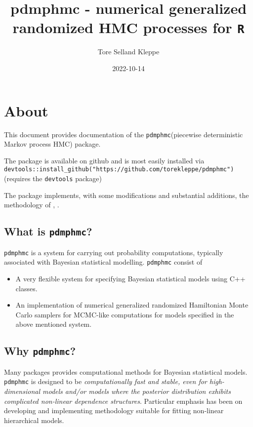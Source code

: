 \documentclass[
]{book}
\title{pdmphmc - numerical generalized randomized HMC processes for \texttt{R}}
\author{Tore Selland Kleppe}
\date{2022-10-14}
\begin{document}
\maketitle

{
\setcounter{tocdepth}{1}
\tableofcontents
}
\hypertarget{about}{%
\chapter{About}\label{about}}

This document provides documentation of the \texttt{pdmphmc}(piecewise deterministic Markov process HMC) package.

The package is available on github and is most easily installed via \texttt{devtools::install\_github("https://github.com/torekleppe/pdmphmc")} (requires the \texttt{devtools} package)

The package implements, with some modifications and substantial additions, the methodology of \citet{kleppe_CTHMC}, \citet{kleppe_amt}.

\hypertarget{what-is-pdmphmc}{%
\section{\texorpdfstring{What is \texttt{pdmphmc}?}{What is pdmphmc?}}\label{what-is-pdmphmc}}

\texttt{pdmphmc} is a system for carrying out probability computations, typically associated with Bayesian statistical modelling. \texttt{pdmphmc} consist of

\begin{itemize}
\item
  A very flexible system for specifying Bayesian statistical models using C++ classes.
\item
  An implementation of numerical generalized randomized Hamiltonian Monte Carlo samplers for MCMC-like computations for models specified in the above mentioned system.
\end{itemize}

\hypertarget{why-pdmphmc}{%
\section{\texorpdfstring{Why \texttt{pdmphmc}?}{Why pdmphmc?}}\label{why-pdmphmc}}

Many packages provides computational methods for Bayesian statistical models. \texttt{pdmphmc} is designed to be \emph{computationally fast and stable, even for high-dimensional models and/or models where the posterior distribution exhibits complicated non-linear dependence structures}. Particular emphasis has been on developing and implementing methodology suitable for fitting non-linear hierarchical models.
\end{document}
